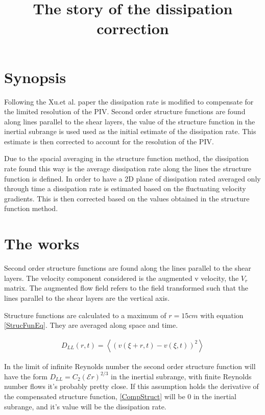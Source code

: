 \documentclass{article}
\title{The story of the dissipation correction}
\date{}
\newcommand\dsize[1]{\ensuremath{\mathcal{\scriptstyle {#1} } }} %
\newcommand\ensem[1]{\ensuremath{\left< {#1} \right>}} %
\newcommand{\diss}{\dsize{E}}
\newenvironment{myeq}   %
    {\begin{equation}
    \begin{gathered}
    }
    {
    \end{gathered}
    \end{equation}
    }
\begin{document}
\maketitle

\section{Synopsis}
Following the Xu.et al. paper the dissipation rate is modified to compensate for the limited resolution of the PIV. Second order structure functions are found along lines parallel to the shear layers, the value of the structure function in the inertial subrange is used used as the initial estimate of the dissipation rate. This estimate is then corrected to account for the resolution of the PIV. 

Due to the spacial averaging in the structure function method, the dissipation rate found this way is the average dissipation rate along the lines the structure function is defined. In order to have a 2D plane of dissipation rated averaged only through time a dissipation rate is estimated based on the fluctuating velocity gradients. This is then corrected based on the values obtained in the structure function method. 

\section{The works}

Second order structure functions are found along the lines parallel to the shear layers. The velocity component considered is the augmented v velocity, the $V_r$ matrix. The augmented flow field refers to the field transformed such that the lines parallel to the shear layers are the vertical axis. 

Structure functions are calculated to a maximum of $r = 15cm$ with equation \ref{StrucFunEq}. They are averaged along space and time. 

\begin{myeq}
    D_{LL}(r,t) = \ensem{(v(\xi + r ,t) - v(\xi,t))^2}
    \label{StrucFunEq}
\end{myeq}

In the limit of infinite Reynolds number the second order structure function will have the form $D_{LL} = C_2(\diss r)^{2/3}$ in the inertial subrange, with finite Reynolds number flows it's probably pretty close. If this assumption holds the derivative of the compensated structure function, \ref{CompStruct} will be 0 in the inertial subrange, and it's value will be the dissipation rate.  
\end{document}
